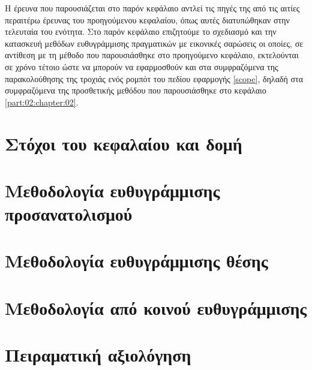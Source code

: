 Η έρευνα που παρουσιάζεται στο παρόν κεφάλαιο αντλεί τις πηγές της από τις
αιτίες περαιτέρω έρευνας του προηγούμενου κεφαλαίου, όπως αυτές διατυπώθηκαν
στην τελευταία του ενότητα. Στο παρόν κεφάλαιο επιζητούμε το σχεδιασμό και την
κατασκευή μεθόδων ευθυγράμμισης πραγματικών με εικονικές σαρώσεις οι οποίες, σε
αντίθεση με τη μέθοδο που παρουσιάσθηκε στο προηγούμενο κεφάλαιο, εκτελούνται
σε χρόνο τέτοιο ώστε να μπορούν να εφαρμοσθούν και στα συμφραζόμενα της
παρακολούθησης της τροχιάς ενός ρομπότ του πεδίου εφαρμογής \ref{scope}, δηλαδή
στα συμφραζόμενα της προσθετικής μεθόδου που παρουσιάσθηκε στο κεφάλαιο
\ref{part:02:chapter:02}.

\section{Στόχοι του κεφαλαίου και δομή}
  \label{section:02_04_01}
  

\section{Μεθοδολογία ευθυγράμμισης προσανατολισμού}
  \label{section:02_04_02}
  

\section{Μεθοδολογία ευθυγράμμισης θέσης}
  \label{section:02_04_03}
  

\section{Μεθοδολογία από κοινού ευθυγράμμισης}
  \label{section:02_04_04}
  

\section{Πειραματική αξιολόγηση}
  \label{section:02_04_05}
  

